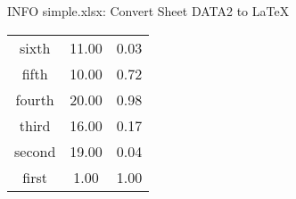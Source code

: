  INFO simple.xlsx: Convert Sheet DATA2 to LaTeX
%
%


%
%
\begin{tabular}{c|c|c|}
sixth & 11.00 & 0.03\\
fifth & 10.00 & 0.72\\
fourth & 20.00 & 0.98\\
third & 16.00 & 0.17\\
second & 19.00 & 0.04\\
first & 1.00 & 1.00
\end{tabular}

